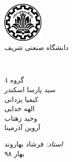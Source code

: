 \begin{titlepage}

	\begin{center}
		
		\includegraphics[width=2cm]{Images/TitlePage/SharifLogo.png}
		\\
		{ دانشگاه صنعتی شریف  }
		\\[6cm]
		
		\\[4cm]
		\linespread{1}
		
		{\Large گروه 4 }
		\\[0.4cm]
		{\small سید پارسا اسکندر
			\\[0.2cm] کیمیا یزدانی
			\\[0.2cm] الهه خدایی 
			\\[0.2cm] وحید زهتاب 
			\\[0.2cm] آروین آذرمینا
			\\[0.5cm]
		}
	
		{\large
			\emph{استاد: }
			فرشاد بهاروند
		}
		\\[4cm]
		
		
		{\large بهار ۹۸ }
	\end{center}
	
\end{titlepage}
